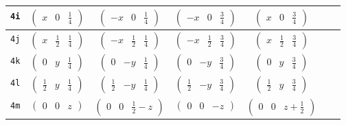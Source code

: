 \documentclass[fleqn,9pt,landscape]{jsarticle}
\begin{document}
\begin{center}
\begin{longtable}{ccccccc}
{\tt 4i} & $ \begin{pmatrix} x & 0 & \frac{1}{4} \end{pmatrix} $ & $ \begin{pmatrix} - x & 0 & \frac{1}{4} \end{pmatrix} $ & $ \begin{pmatrix} - x & 0 & \frac{3}{4} \end{pmatrix} $ & $ \begin{pmatrix} x & 0 & \frac{3}{4} \end{pmatrix} $ & $  $ & $  $ \\ \hline
{\tt 4j} & $ \begin{pmatrix} x & \frac{1}{2} & \frac{1}{4} \end{pmatrix} $ & $ \begin{pmatrix} - x & \frac{1}{2} & \frac{1}{4} \end{pmatrix} $ & $ \begin{pmatrix} - x & \frac{1}{2} & \frac{3}{4} \end{pmatrix} $ & $ \begin{pmatrix} x & \frac{1}{2} & \frac{3}{4} \end{pmatrix} $ & $  $ & $  $ \\ \hline
{\tt 4k} & $ \begin{pmatrix} 0 & y & \frac{1}{4} \end{pmatrix} $ & $ \begin{pmatrix} 0 & - y & \frac{1}{4} \end{pmatrix} $ & $ \begin{pmatrix} 0 & - y & \frac{3}{4} \end{pmatrix} $ & $ \begin{pmatrix} 0 & y & \frac{3}{4} \end{pmatrix} $ & $  $ & $  $ \\ \hline
{\tt 4l} & $ \begin{pmatrix} \frac{1}{2} & y & \frac{1}{4} \end{pmatrix} $ & $ \begin{pmatrix} \frac{1}{2} & - y & \frac{1}{4} \end{pmatrix} $ & $ \begin{pmatrix} \frac{1}{2} & - y & \frac{3}{4} \end{pmatrix} $ & $ \begin{pmatrix} \frac{1}{2} & y & \frac{3}{4} \end{pmatrix} $ & $  $ & $  $ \\ \hline
{\tt 4m} & $ \begin{pmatrix} 0 & 0 & z \end{pmatrix} $ & $ \begin{pmatrix} 0 & 0 & \frac{1}{2} - z \end{pmatrix} $ & $ \begin{pmatrix} 0 & 0 & - z \end{pmatrix} $ & $ \begin{pmatrix} 0 & 0 & z + \frac{1}{2} \end{pmatrix} $ & $  $ & $  $ \\ \hline

\end{longtable}
\end{center}
\end{document}
